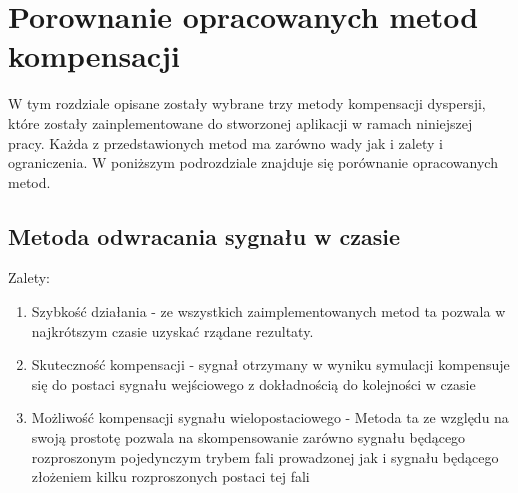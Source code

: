 \section{Porownanie opracowanych metod kompensacji}

W tym rozdziale opisane zostały wybrane trzy metody kompensacji dyspersji, które zostały zainplementowane do stworzonej aplikacji w ramach niniejszej pracy. Każda z przedstawionych metod ma zarówno wady jak i zalety i ograniczenia. W poniższym podrozdziale znajduje się porównanie opracowanych metod.
\subsection{Metoda odwracania sygnału w czasie}
Zalety:
\begin{enumerate}
\item Szybkość działania - ze wszystkich zaimplementowanych metod ta pozwala w najkrótszym czasie uzyskać rządane rezultaty.
\item Skuteczność kompensacji - sygnał otrzymany w wyniku symulacji kompensuje się do postaci sygnału wejściowego z dokładnością do kolejności w czasie
\item Możliwość kompensacji sygnału wielopostaciowego - Metoda ta ze względu na swoją prostotę pozwala na skompensowanie zarówno sygnału będącego rozproszonym pojedynczym trybem fali prowadzonej jak i sygnału będącego złożeniem kilku rozproszonych postaci tej fali 
\end{enumerate}

